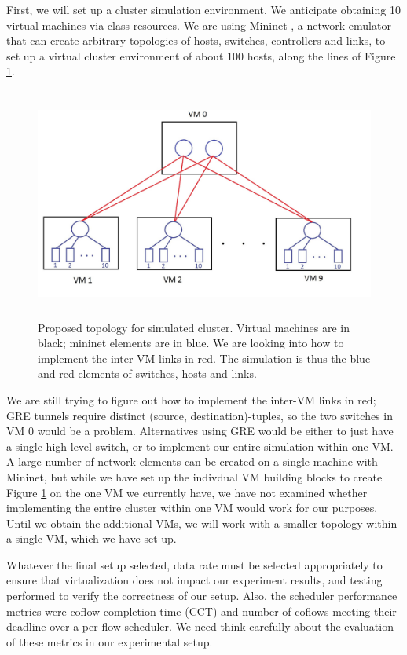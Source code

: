 \documentclass{article}
\begin{document}
First, we will set up a cluster simulation environment. We anticipate obtaining 10 virtual machines via class resources. We are using Mininet \cite{website:mininet}, a network emulator that can create arbitrary topologies of hosts, switches, controllers and links, to set up a virtual cluster environment of about 100 hosts, along the lines of Figure \ref{fig:cluster_topology}. 

\begin{figure}[h]
	\includegraphics[height = 3in]{proposed_cluster_topology_final.jpg}
	\caption{Proposed topology for simulated cluster. Virtual machines are in black; mininet elements are in blue. We are looking into how to implement the inter-VM links in red. The simulation is thus the blue and red elements of switches, hosts and links.}
    \label{fig:cluster_topology}
\end{figure}

We are still trying to figure out how to implement the inter-VM links in red; GRE tunnels require distinct (source, destination)-tuples, so the two switches in VM 0 would be a problem. Alternatives using GRE would be either to just have a single high level switch, or to implement our entire simulation within one VM. A large number of network elements can be created on a single machine with Mininet, but while we have set up the indivdual VM building blocks to create Figure \ref{fig:cluster_topology} on the one VM we currently have, we have not examined whether implementing the entire cluster within one VM would work for our purposes. Until we obtain the additional VMs, we will work with a smaller topology within a single VM, which we have set up. 

Whatever the final setup selected, data rate must be selected appropriately to ensure that virtualization does not impact our experiment results, and testing performed to verify the correctness of our setup. Also, the scheduler performance metrics were coflow completion time (CCT) and number of coflows meeting their deadline over a per-flow scheduler. We need think carefully about the evaluation of these metrics in our experimental setup.
\end{document}
